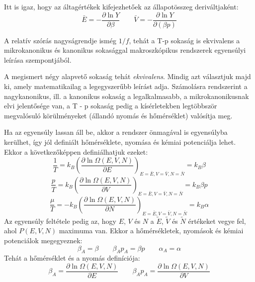 \documentclass[../main.tex]{subfiles}
\begin{document}
Itt is igaz, hogy az áltagértékek kifejezhetőek az állapotösszeg deriváltjaként:
\begin{equation}
    \bar{E} = - \frac{\partial \ln Y}{\partial \beta} \qquad \bar{V} = - \frac{\partial \ln Y}{\partial (\beta p)}
\end{equation}

A relatív szórás nagyságrendje ismég $1/f$, tehát a T-p sokaság is ekvivalens a mikrokanonikus és kanonikus sokasággal makroszkópikus rendszerek egyensúlyi leírása szempontjából.

A megismert négy alapvető sokaság tehát \textit{ekvivalens}. Mindig azt választjuk majd
ki, amely matematikailag a legegyszerűbb leírást adja. Számolásra rendszerint a nagykanonikus, ill. a kanonikus sokaság a legalkalmasabb, a mikrokanonikusnak elvi jelentősége van,
a T - p sokaság pedig a kísérletekben legtöbbször megvalósuló körülményeket (állandó nyomás és hőmérséklet) valósítja meg.

Ha az egyensúly lassan áll be, akkor a rendszer önmagával is egyensúlyba kerülhet, így jól definiált hőmérséklete, nyomása és kémiai potenciálja lehet. Ekkor a következőképpen definiálhatjuk ezeket:
\begin{equation}
    \frac{1}{T} = k_B \left( \frac{\partial \ln \Omega(E, V, N)}{\partial E} \right)_{E = \bar{E}, V = \bar{V}, N = \bar{N}} = k_B \beta
\end{equation}
\begin{equation}
    \frac{p}{T} = k_B \left( \frac{\partial \ln \Omega(E, V, N)}{\partial V} \right)_{E = \bar{E}, V = \bar{V}, N = \bar{N}} = k_B \beta p
\end{equation}
\begin{equation}
    \frac{\mu}{T} = - k_B \left( \frac{\partial \ln \Omega(E, V, N)}{\partial N} \right)_{E = \bar{E}, V = \bar{V}, N = \bar{N}} = k_B \alpha
\end{equation}
Az egyensúly feltétele pedig az, hogy $E$, $V$ és $N$ a $\tilde{E}$, $\tilde{V}$ és $\tilde{N}$ értékeket vegye fel, ahol $P(E, V, N)$ maximuma van. Ekkor a hőmérsékletek, nyomások és kémiai potenciálok megegyeznek:
\begin{equation}
    \beta_A = \beta \qquad \beta_A p_A = \beta p \qquad \alpha_A = \alpha
\end{equation}
Tehát a hőmérséklet és a nyomás definíciója:
\begin{equation}
    \beta_A = \frac{\partial \ln \Omega (E, V, N)}{\partial E} \qquad \beta_A p_A = \frac{\partial \ln \Omega (E, V, N)}{\partial V}
\end{equation}
\end{document}
